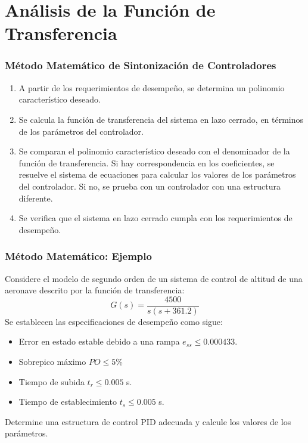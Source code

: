 \documentclass[aspectratio=169,handout]{beamer}
\theoremstyle{definition}
\theoremstyle{plain}
\theoremstyle{remark}
\begin{document}
\section{Análisis de la Función de Transferencia}
\begin{frame}[<+->]\frametitle{Método Matemático de Sintonización de Controladores}
\begin{enumerate}
	\item A partir de los requerimientos de desempeño, se determina un polinomio característico deseado.
	\item Se calcula la función de transferencia del sistema en lazo cerrado, en términos de los parámetros del controlador.
	\item Se comparan el polinomio característico deseado con el denominador de la función de transferencia. Si hay correspondencia en los coeficientes, se resuelve el sistema de ecuaciones para calcular los valores de los parámetros del controlador. Si no, se prueba con un controlador con una estructura diferente.
	\item Se verifica que el sistema en lazo cerrado cumpla con los requerimientos de desempeño.
\end{enumerate}
\end{frame}

\begin{frame}[c]\frametitle{Método Matemático: Ejemplo}
Considere el modelo de segundo orden de un sistema de control de altitud de una aeronave descrito por la función de transferencia:
\begin{equation*}
	G(s) = \frac{4500}{s(s+361.2)}
\end{equation*}
Se establecen las especificaciones de desempeño como sigue:
\begin{itemize}
	\item Error en estado estable debido a una rampa $e_{ss} \leq 0.000433$.
	\item Sobrepico máximo $PO \leq 5\%$
	\item Tiempo de subida $t_r \leq 0.005$ s.
	\item Tiempo de establecimiento $t_s \leq 0.005$ s.
\end{itemize}
Determine una estructura de control PID adecuada y calcule los valores de los parámetros.
\end{frame}
\end{document}
